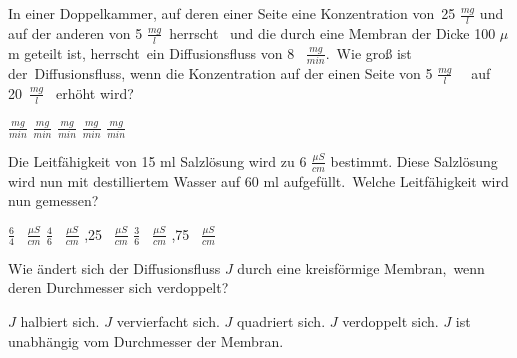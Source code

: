 \documentclass[11pt]{exam}
\begin{document}
\setlength{\voffset}{-0.5in}
\setlength{\headsep}{5pt}

\hspace{2mm}
 \hspace{5mm}
\vspace{4mm}

\begin{questions}

\question In einer Doppelkammer, auf deren einer Seite eine Konzentration von 25 \(\frac{mg}{l} \) und auf der anderen von 5 \(  \frac{mg}{l} \) herrscht  und die durch eine Membran der Dicke 100 \(\mu \)m geteilt ist, herrscht ein Diffusionsfluss von 8  \( \frac{mg}{min}\). Wie groß ist der Diffusionsfluss, wenn die Konzentration auf der einen Seite von 5 \(  \frac{mg}{l} \)   auf 20 \(  \frac{mg}{l} \)  erhöht wird?

\begin{choices}
	 \( \frac{mg}{min} \)
	 \( \frac{mg}{min} \)
	 \( \frac{mg}{min} \)
	 \( \frac{mg}{min} \)
	 \( \frac{mg}{min} \)
\end{choices}

\vspace{3mm}\question Die Leitfähigkeit von 15 ml Salzlösung wird zu 6 \( \frac{\mu S}{cm} \) bestimmt. Diese Salzlösung wird nun mit destilliertem Wasser auf 60 ml aufgefüllt. Welche Leitfähigkeit wird nun gemessen?

\begin{choices}
	\choice \( \frac{6}{4} \)  \( \frac{\mu S}{cm} \)
	\choice \( \frac{4}{6} \)  \( \frac{\mu S}{cm} \)
	,25  \( \frac{\mu S}{cm} \)
	\choice \( \frac{3}{6} \)  \( \frac{\mu S}{cm} \)
	,75  \( \frac{\mu S}{cm} \)
\end{choices}

\vspace{3mm}\question Wie ändert sich der Diffusionsfluss \( J \) durch eine kreisförmige Membran, wenn deren Durchmesser sich verdoppelt?

\begin{choices}
	\choice \( J \) halbiert sich.
	\choice \( J \) vervierfacht sich.
	\choice \( J \) quadriert sich.
	\choice \( J \) verdoppelt sich.
	\choice \( J \) ist unabhängig vom Durchmesser der Membran.
\end{choices}


\end{questions}
\end{document}
